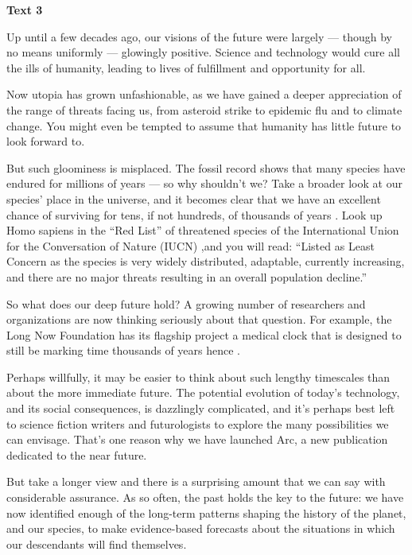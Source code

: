 
\begin{center}\textbf{Text 3}\end{center}

\qquad Up until a few decades ago, our visions of the future were largely --- though by no means uniformly --- glowingly positive. Science and technology would cure all the ills of humanity, leading to lives of fulfillment and opportunity for all.

\qquad Now utopia has grown unfashionable, as we have gained a deeper appreciation of the range of threats facing us, from asteroid strike to epidemic flu and to climate change. You might even be tempted to assume that humanity has little future to look forward to.

\qquad But such gloominess is misplaced. The fossil record shows that many species have endured for millions of years --- so why shouldn't we? Take a broader look at our species' place in the universe, and it becomes clear that we have an excellent chance of surviving for tens, if not hundreds, of thousands of years . Look up Homo sapiens in the ``Red List'' of threatened species of the International Union for the Conversation of Nature (IUCN) ,and you will read: ``Listed as Least Concern as the species is very widely distributed, adaptable, currently increasing, and there are no major threats resulting in an overall population decline.''

\qquad So what does our deep future hold? A growing number of researchers and organizations are now thinking seriously about that question. For example, the Long Now Foundation has its flagship project a medical clock that is designed to still be marking time thousands of years hence .

\qquad Perhaps willfully, it may be easier to think about such lengthy timescales than about the more immediate future. The potential evolution of today's technology, and its social consequences, is dazzlingly complicated, and it's perhaps best left to science fiction writers and futurologists to explore the many possibilities we can envisage. That's one reason why we have launched Arc, a new publication dedicated to the near future.

\qquad But take a longer view and there is a surprising amount that we can say with considerable assurance. As so often, the past holds the key to the future: we have now identified enough of the long-term patterns shaping the history of the planet, and our species, to make evidence-based forecasts about the situations in which our descendants will find themselves.

